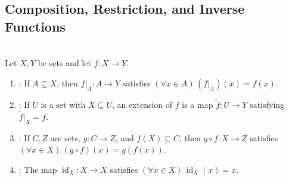 \subsection{Composition, Restriction, and Inverse Functions}

\begin{definition} \label{def:composition-restriction-extension-identity} \\
Let $X,Y$ be sets and let $f:X\to Y$.
\begin{enumerate}[label=(\roman*)]
\setlength{\itemsep}{0pt}
\item {}: If $A\subseteq X$, then $f|_A:A\to Y$ satisfies $(\forall x\in A)\,(f|_A)(x)=f(x)$.
\item {}: If $U$ is a set with $X\subseteq U$, an extension of $f$ is a map $\widetilde f:U\to Y$ satisfying $\widetilde f|_X=f$.
\item {}: If $C,Z$ are sets, $g:C\to Z$, and $f(X)\subseteq C$, then $g\circ f:X\to Z$ satisfies $(\forall x\in X)\,(g\circ f)(x)=g(f(x))$.
\item {}: The map $\operatorname{id}_X:X\to X$ satisfies $(\forall x\in X)\,\operatorname{id}_X(x)=x$.
\end{enumerate}
\end{definition}

